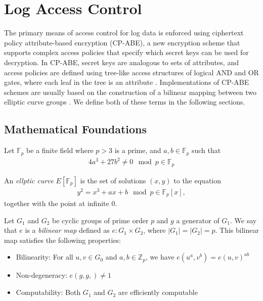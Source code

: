 \documentclass{sig-alternate}
\newenvironment{definition}[1][Definition]{\begin{trivlist}
\item[\hskip \labelsep {\bfseries #1}]}{\end{trivlist}}
\begin{document}
\section{Log Access Control}
The primary means of access control for log data is enforced using ciphertext policy 
attribute-based encryption (CP-ABE), a new encryption scheme that supports complex
access policies that specify which secret keys can be used for decryption. In CP-ABE, secret keys are analogous
to sets of attributes, and access policies are defined using tree-like access structures of logical AND and OR
gates, where each leaf in the tree is an attribute \cite{Bethencourt2007-CPABE}. Implementations of 
CP-ABE schemes are usually based on the construction of a bilinear mapping between two elliptic curve 
groups \cite{Bethencourt2007-CPABE} \cite{Junod2010-ABE}. We define both of these terms in the following sections.

\subsection{Mathematical Foundations}
\begin{definition}
Let $\mathbb{F}_p$ be a finite field where $p > 3$ is a prime, and $a, b \in \mathbb{F}_p$ such that
\begin{align*}
4a^3 + 27b^2 \not= 0 \mod p \in \mathbb{F}_p
\end{align*}

An \emph{ellptic curve} $E[\mathbb{F}_p]$ is the set of solutions $(x, y)$ to the equation
\begin{align*}
y^2 = x^3 + ax + b \mod p \in \mathbb{F}_p[x],
\end{align*}
together with the point at infinite $0$.
\end{definition}

\begin{definition}
Let $G_1$ and $G_2$ be cyclic groups of prime order $p$ and $g$ a generator of $G_1$. We say that $e$ is a \emph{bilinear map} defined as $e : G_1 \times G_2$, where $|G_1| = |G_2| = p$. This bilinear map satisfies the following properties:
\begin{itemize}
	\item Bilinearity: For all $u, v \in G_0$ and $a, b \in \mathbb{Z}_p$, we have $e(u^a, v^b) = e(u,v)^{ab}$
	\item Non-degeneracy: $e(g, g,) \not= 1$
	\item Computability: Both $G_1$ and $G_2$ are efficiently computable
\end{itemize}
\end{definition}
\end{document}
